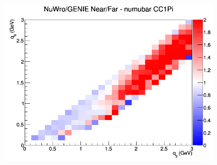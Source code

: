 \documentclass[12pt]{article}
\begin{document}
\begin{figure}[h]
\endminipage
{}
\includegraphics[width=\linewidth]{q0_q3/nominal/ratios/CC1Pi_NuWro_GENIE_numubar_NF_q3_q0.png}
\endminipage
\newline
\end{figure}
\clearpage
\end{document}
